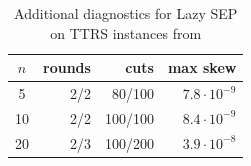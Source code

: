 \documentclass[11pt]{article}
\begin{document}
\begin{table}[htbp]
\centering
\caption{Additional diagnostics for Lazy SEP on TTRS instances from \cite{Burer.Anstreicher.2013}}
\label{tab:TTRS_diagnostics}
\vskip 10pt
\begingroup
\begin{tabular}{c|r r r}
\hline
$n$& rounds & cuts&max skew\\
\hline
5 & 2/2 & 80/100 & $7.8\cdot 10^{-9}$\\
10 & 2/2 & 100/100 & $8.4\cdot 10^{-9}$\\
20 & 2/3 & 100/200 & $3.9\cdot 10^{-8}$\\
\hline
\hline
\end{tabular}
\endgroup
\end{table}
\end{document}
